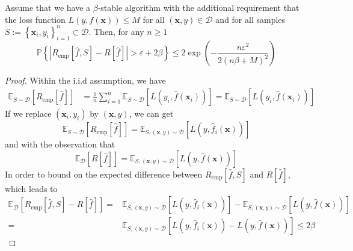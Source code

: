 \begin{theorem} \label{thm:bousquet-and-elisseeff}
	Assume that we have a $\beta$-stable algorithm with the additional requirement that the loss function $L\left(y,f(\mathbf{x})\right)\leq M$ for all $(\mathbf{x},y)\in\mathcal{D}$ and for all samples $S:=\left\{\mathbf{x}_{i},y_{i}\right\}_{i=1}^{n}\subset\mathcal{D}$. Then, for any $n\geq 1$
	\begin{equation}
		\mathbb{P}\left\{\left|R_{\text{emp}}[\hat{f},S]-R[\hat{f}]\right|>\varepsilon+2\beta\right\}\leq 2\exp\left(-\frac{n\varepsilon^{2}}{2(n\beta+M)^{2}}\right)
	\end{equation}
\end{theorem}

\begin{proof}
	Within the i.i.d assumption, we have
	\begin{equation}
		\begin{aligned}
			\mathbb{E}_{S\sim\mathcal{D}}\left[R_{\text{emp}}[\hat{f}]\right] & =\frac{1}{n}\sum_{i=1}^{n}\mathbb{E}_{S\sim\mathcal{D}}\left[L\left(y_{i},\hat{f}(\mathbf{x}_{i})\right)\right]=\mathbb{E}_{S\sim\mathcal{D}}\left[L\left(y_{i},\hat{f}(\mathbf{x}_{i})\right)\right]
		\end{aligned}
	\end{equation}
	If we replace $(\mathbf{x}_{i},y_{i})$ by $(\mathbf{x},y)$, we can get
	\begin{equation}
		\mathbb{E}_{S\sim\mathcal{D}}\left[R_{\text{emp}}[\hat{f}]\right]=\mathbb{E}_{S,\left(\mathbf{x},y\right)\sim\mathcal{D}}\left[L\left(y,\hat{f}_{i}(\mathbf{x})\right)\right]
	\end{equation}
	and with the observation that
	\begin{equation}
		\mathbb{E}_{\mathcal{D}}\left[R[\hat{f}]\right]=\mathbb{E}_{S,\left(\mathbf{x},y\right)\sim\mathcal{D}}\left[L\left(y,\hat{f}(\mathbf{x})\right)\right]
	\end{equation}
	In order to bound on the expected difference between $R_{\text{emp}}[\hat{f},S]$ and $R[\hat{f}]$, which leads to
	\begin{equation}
		\begin{aligned}
			\mathbb{E}_{\mathcal{D}}\left[R_{\text{emp}}[\hat{f},S]-R[\hat{f}]\right]= & \mathbb{E}_{S,\left(\mathbf{x},y\right)\sim\mathcal{D}}\left[L\left(y,\hat{f}_{i}(\mathbf{x})\right)\right]-\mathbb{E}_{S,\left(\mathbf{x},y\right)\sim\mathcal{D}}\left[L\left(y,\hat{f}(\mathbf{x})\right)\right] \\
			=                                                                          & \mathbb{E}_{S,\left(\mathbf{x},y\right)\sim\mathcal{D}}\left[L\left(y,\hat{f}_{i}(\mathbf{x})\right)-L\left(y,\hat{f}(\mathbf{x})\right)\right]\leq 2\beta
		\end{aligned}
	\end{equation}


\end{proof}
